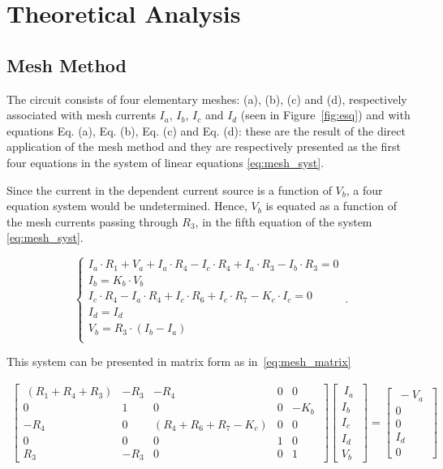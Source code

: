 \section{Theoretical Analysis}
\label{sec:analysis}

\subsection{Mesh Method}
\label{subsec:mesh}

The circuit consists of four elementary meshes: (a), (b), (c) and (d), respectively associated with mesh currents $I_a$, $I_b$, $I_c$ and $I_d$ (seen in Figure~\ref{fig:esq}) and with equations Eq. (a), Eq. (b),  Eq. (c) and Eq. (d): these are the result of the direct application of the mesh method and they are respectively presented as the first four equations in the system of linear equations \ref{eq:mesh_syst}.

Since the current in the dependent current source is a function of $V_b$, a four equation system would be undetermined. Hence, $V_b$ is equated as a function of the mesh currents passing through $R_3$, in the fifth equation of the system \ref{eq:mesh_syst}. 

\begin{equation}
    \begin{cases}
      I_a \cdot R_1 + V_a + I_a \cdot R_4 - I_c \cdot R_4 + I_a \cdot R_3 - I_b \cdot R_3 = 0\\
      I_b = K_b \cdot V_b\\
      I_c \cdot R_4 - I_a \cdot R_4 + I_c \cdot R_6 + I_c \cdot R_7 - K_c \cdot I_c = 0\\
      I_d = I_d\\
      V_b = R_3 \cdot ( I_b - I_a )\\
    \end{cases}\,.
    \label{eq:mesh_syst}
\end{equation}

This system can be presented in matrix form as in~\ref{eq:mesh_matrix}

\begin{gather}
    \begin{bmatrix} 
      \ (R_1 + R_4 + R_3) & -R_3 & -R_4 & 0 & 0 \\ 0 & 1 & 0 & 0 & -K_b \ \\ -R_4 & 0 & (R_4 + R_6 + R_7 - K_c) & 0 & 0 \\ 0 & 0 & 0 & 1 & 0 \\ R_3 & -R_3 & 0 & 0 & 1
    \end{bmatrix}
    \begin{bmatrix}
      \ I_a \ \\ I_b \\ I_c \\ I_d \\ V_b 
    \end{bmatrix}
    =
    \begin{bmatrix}
      \ -V_a \ \\ 0 \\ 0 \\ I_d \\ 0 
    \end{bmatrix}
    \label{eq:mesh_matrix}
\end{gather}

